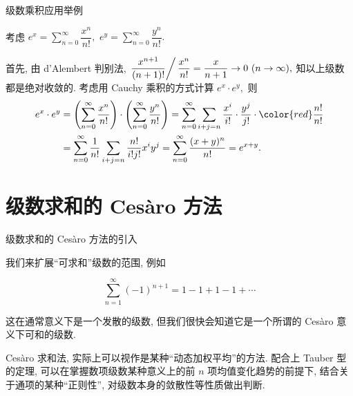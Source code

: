 
\begin{frame}{级数乘积应用举例}

考虑 $e^x = \sum\limits_{n=0}^\infty \dfrac{x^n}{n!},$ $e^y = \sum\limits_{n=0}^\infty \dfrac{y^n}{n!}.$

首先, 由 d'Alembert 判别法, $\left.\dfrac{x^{n+1}}{(n+1)!} \right/ \dfrac{x^n}{n!} = \dfrac{x}{n+1} \to 0 ~ (n \to \infty),$ 知以上级数都是绝对收敛的.
\pause
考虑用 Cauchy 乘积的方式计算 $e^x \cdot e^y,$ 则
\begin{align*}
e^x \cdot e^y & = \left( \sum\limits_{n=0}^\infty \dfrac{x^n}{n!} \right) \cdot \left( \sum\limits_{n=0}^\infty \dfrac{y^n}{n!} \right) = \sum\limits_{n=0}^\infty \sum_{i+j=n} \dfrac{x^i}{i!} \cdot \dfrac{y^j}{j!} \cdot {\color{red} \dfrac{n!}{n!}} \\
& = \sum\limits_{n=0}^\infty \dfrac{1}{n!} \sum_{i+j=n} \dfrac{n!}{i!j!} x^i y^j = \sum\limits_{n=0}^\infty \dfrac{(x+y)^n}{n!} = e^{x+y}.
\end{align*}

\end{frame}


\section{级数求和的 Cesàro 方法}


\begin{frame}{级数求和的 Cesàro 方法的引入}

我们来扩展``可求和''级数的范围, 例如

\pause

\[\sum\limits_{n=1}^{\infty} (-1)^{n+1} = 1 - 1 + 1 - 1 + \cdots\]

\pause

这在通常意义下是一个发散的级数, 但我们很快会知道它是一个所谓的 Cesàro 意义下可和的级数.

\vspace{1em}
\pause

Cesàro 求和法, 实际上可以视作是某种``动态加权平均''的方法. 配合上 Tauber 型的定理, 可以在掌握数项级数某种意义上的前 $n$ 项均值变化趋势的前提下, 结合关于通项的某种``正则性'', 对级数本身的敛散性等性质做出判断.

\end{frame}

